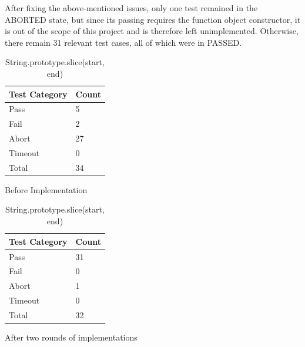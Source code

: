 \documentclass[a4paper,11pt,twoside]{report}
\begin{document}
\begin{itemize}
After fixing the above-mentioned issues, only one test remained in the ABORTED state, but since its passing requires the function object constructor, it is out of the scope of this project and is therefore left unimplemented. Otherwise, there remain 31 relevant test cases, all of which were in PASSED.
\begin{table}[ht!]
\centering
\begin{subtable}{0.5\textwidth}
\centering
\begin{tabular}{|p{3cm}|p{2cm}|} \hline
\textbf{Test Category} & \textbf{Count} \\ \hline
Pass & 5 \\
Fail & 2 \\
Abort & 27 \\
Timeout & 0 \\
Total & 34 \\ \hline
\end{tabular}
\caption{Before Implementation}
\end{subtable}%
\begin{subtable}{0.5\textwidth}
\centering
\begin{tabular}{|p{3cm}|p{2cm}|} \hline
\textbf{Test Category} & \textbf{Count} \\ \hline
Pass & 31 \\
Fail & 0 \\
Abort & 1 \\
Timeout & 0 \\
Total & 32 \\ \hline
\end{tabular}
\caption{After two rounds of implementations}
\end{subtable}
\caption{String.prototype.slice(start, end)}
\end{table}


\end{itemize}
\end{document}
